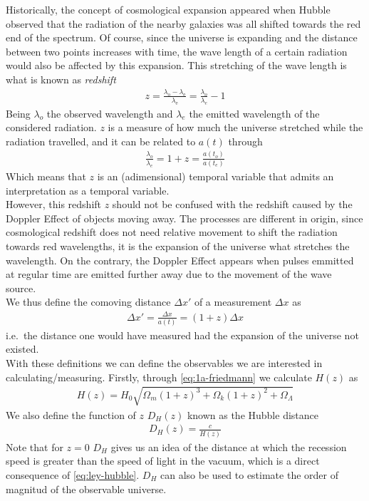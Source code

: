 Historically, the concept of cosmological expansion appeared when Hubble observed that the radiation of the nearby galaxies was all shifted towards the red end of the spectrum. Of course, since the universe is expanding and the distance between two points increases with time, the wave length of a certain radiation would also be affected by this expansion. This stretching of the wave length is what is known as \textit{redshift} 
\begin{align}
	z = \frac{\lambda_{\text{o}} - \lambda_{\text{e}}}{\lambda_{\text{e}}} = \frac{\lambda_o}{\lambda_e} - 1
	\label{eq:redshift}
\end{align}
Being $\lambda_o$ the observed wavelength and $\lambda_e$ the emitted wavelength of the considered radiation. $z$ is a measure of how much the universe stretched while the radiation travelled, and it can be related to $a(t)$ through 
\begin{align}
	\frac{\lambda_o}{\lambda_e} = 1+z = \frac{a(t_o)}{a(t_e)}
\end{align}
Which means that $z$ is an (adimensional) temporal variable that admits an interpretation as a temporal variable. \\

However, this redshift $z$ should not be confused with the redshift caused by the Doppler Effect of objects moving away. The processes are different in origin, since cosmological redshift does not need relative movement to shift the radiation towards red wavelengths, it is the expansion of the universe what stretches the wavelength. On the contrary, the Doppler Effect appears when pulses emmitted at regular time are emitted further away due to the movement of the wave source. \\

We thus define the comoving distance $\Delta x'$ of a measurement $\Delta x$ as 
\begin{align}
	\Delta x' =\frac{\Delta x}{a(t)}= (1+z)\Delta x
\end{align}
i.e.\ the distance one would have measured had the expansion of the universe not existed. \\

With these definitions we can define  the observables we are interested in calculating/measuring. Firstly, through \eqref{eq:1a-friedmann} we calculate $H(z)$ as  
\begin{align}
	H(z) = H_0 \sqrt{\Omega_m(1+z)^3 + \Omega_k(1+z)^2 + \Omega_\Lambda} 
\end{align}
We also define the function of $z$ $D_H(z)$ known as the Hubble distance
\begin{align}
	D_H(z)  = \frac{c}{H(z)}
	\label{eq:DH-definition}
\end{align}
Note that for $z = 0$ $D_H$ gives us an idea of the distance at which the recession speed is greater than the speed of light in the vacuum, which is a direct consequence of \eqref{eq:ley-hubble}. $D_H$ can also be used to estimate the order of magnitud of the observable universe. \\

